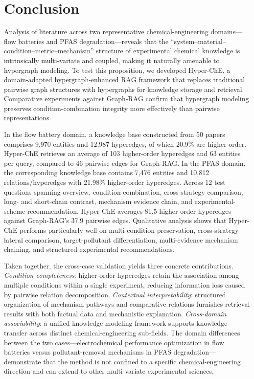 \section{Conclusion}
\label{sec:conclusion}

Analysis of literature across two representative chemical-engineering domains---flow batteries and PFAS degradation---reveals that the ``system--material--condition--metric--mechanism'' structure of experimental chemical knowledge is intrinsically multi-variate and coupled, making it naturally amenable to hypergraph modeling. To test this proposition, we developed Hyper-ChE, a domain-adapted hypergraph-enhanced RAG framework that replaces traditional pairwise graph structures with hypergraphs for knowledge storage and retrieval. Comparative experiments against Graph-RAG confirm that hypergraph modeling preserves condition-combination integrity more effectively than pairwise representations.

In the flow battery domain, a knowledge base constructed from 50 papers comprises 9,970 entities and 12,987 hyperedges, of which 20.9\% are higher-order. Hyper-ChE retrieves an average of 103 higher-order hyperedges and 63 entities per query, compared to 46 pairwise edges for Graph-RAG. In the PFAS domain, the corresponding knowledge base contains 7,476 entities and 10,812 relations/hyperedges with 21.98\% higher-order hyperedges. Across 12 test questions spanning overview, condition combination, cross-strategy comparison, long- and short-chain contrast, mechanism evidence chain, and experimental-scheme recommendation, Hyper-ChE averages 81.5 higher-order hyperedges against Graph-RAG's 37.9 pairwise edges. Qualitative analysis shows that Hyper-ChE performs particularly well on multi-condition preservation, cross-strategy lateral comparison, target-pollutant differentiation, multi-evidence mechanism chaining, and structured experimental recommendations.

Taken together, the cross-case validation yields three concrete contributions. \emph{Condition completeness}: higher-order hyperedges retain the association among multiple conditions within a single experiment, reducing information loss caused by pairwise relation decomposition. \emph{Contextual interpretability}: structured organization of mechanism pathways and comparative relations furnishes retrieval results with both factual data and mechanistic explanation. \emph{Cross-domain associability}: a unified knowledge-modeling framework supports knowledge transfer across distinct chemical-engineering sub-fields. The domain differences between the two cases---electrochemical performance optimization in flow batteries versus pollutant-removal mechanisms in PFAS degradation---demonstrate that the method is not confined to a specific chemical-engineering direction and can extend to other multi-variate experimental sciences.

